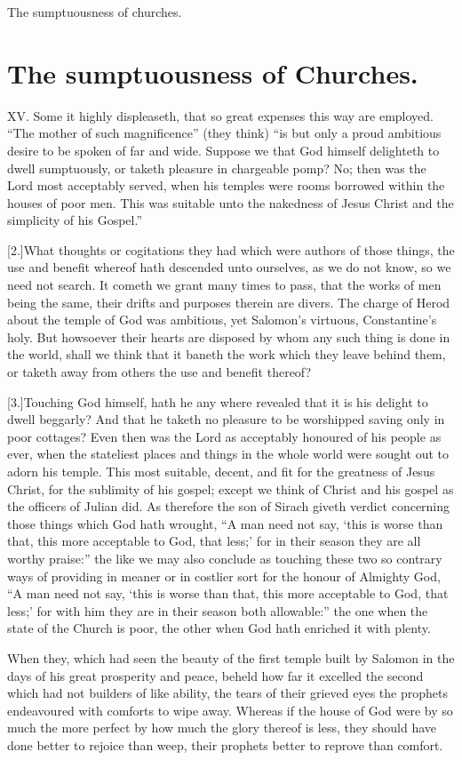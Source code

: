 The sumptuousness of churches.
\section*{The sumptuousness of Churches.}
XV. Some it highly displeaseth, that so great expenses this way are employed. “The mother of such magnificence” (they think) “is but only a proud ambitious desire to be spoken of far and wide. Suppose we that God himself delighteth to dwell sumptuously, or taketh pleasure in  chargeable pomp?
 No; then was the Lord most acceptably served, when his temples were rooms borrowed within the houses of poor men. This was suitable unto the nakedness of Jesus Christ and the simplicity of his Gospel.”

[2.]What thoughts or cogitations they had which were authors of those things, the use and benefit whereof hath descended unto ourselves, as we do not know, so we need not search. It cometh we grant many times to pass, that the works of men being the same, their drifts and purposes therein are divers. The charge of Herod about the temple of God was ambitious, yet Salomon’s virtuous, Constantine’s holy. But howsoever their hearts are disposed by whom any such thing is done in the world, shall we think that it baneth the work which they leave behind them, or taketh away from others the use and benefit thereof?

[3.]Touching God himself, hath he any where revealed that it is his delight to dwell beggarly? And that he taketh no pleasure to be worshipped saving only in poor cottages? Even then was the Lord as acceptably honoured of his people as ever, when the stateliest places and things in the whole world were sought out to adorn his temple. This most suitable, decent, and fit for the greatness of Jesus Christ, for the sublimity of his gospel; except we think of Christ and his gospel as the officers of Julian did. As therefore the son of Sirach giveth verdict concerning those things which God hath wrought, “A man need not say, ‘this is worse than that, this more acceptable to God, that less;’ for in their season they are all worthy praise:” the like we may also conclude as touching these two so contrary ways of providing in meaner or in costlier sort for the honour of Almighty God, “A man need not say, ‘this is worse than that, this more acceptable to God, that less;’ for with him they are in their season both allowable:” the one when the state of the Church is poor, the other when God hath enriched it with plenty.

When they, which had seen the beauty of the first temple  built by Salomon in the days of his great prosperity and peace, beheld how far it excelled the second which had not builders of like ability, the tears of their grieved eyes the prophets endeavoured with comforts to wipe away.
 Whereas if the house of God were by so much the more perfect by how much the glory thereof is less, they should have done better to rejoice than weep, their prophets better to reprove than comfort.

